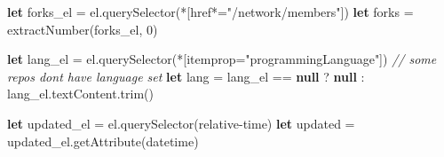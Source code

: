 \documentclass[sigplan,10pt,anonymous,review]{acmart}
\newenvironment{Shaded}{}{}
\newcommand{\AttributeTok}[1]{\textcolor[rgb]{0.49,0.56,0.16}{#1}}
\newcommand{\CommentTok}[1]{\textcolor[rgb]{0.38,0.63,0.69}{\textit{#1}}}
\newcommand{\DecValTok}[1]{\textcolor[rgb]{0.25,0.63,0.44}{#1}}
\newcommand{\KeywordTok}[1]{\textcolor[rgb]{0.00,0.44,0.13}{\textbf{#1}}}
\newcommand{\NormalTok}[1]{#1}
\newcommand{\OperatorTok}[1]{\textcolor[rgb]{0.40,0.40,0.40}{#1}}
\newcommand{\StringTok}[1]{\textcolor[rgb]{0.25,0.44,0.63}{#1}}
\newcommand{\VariableTok}[1]{\textcolor[rgb]{0.10,0.09,0.49}{#1}}
\begin{document}
\begin{Shaded}
\begin{Highlighting}[]
      \KeywordTok{let}\NormalTok{ forks\_el }\OperatorTok{=} \VariableTok{el}\NormalTok{.}\AttributeTok{querySelector}\NormalTok{(}\StringTok{\textquotesingle{}*[href*="/network/members"]\textquotesingle{}}\NormalTok{)}
      \KeywordTok{let}\NormalTok{ forks }\OperatorTok{=} \AttributeTok{extractNumber}\NormalTok{(forks\_el}\OperatorTok{,} \DecValTok{0}\NormalTok{)}

      \KeywordTok{let}\NormalTok{ lang\_el }\OperatorTok{=} \VariableTok{el}\NormalTok{.}\AttributeTok{querySelector}\NormalTok{(}\StringTok{\textquotesingle{}*[itemprop="programmingLanguage"]\textquotesingle{}}\NormalTok{)}
      \CommentTok{// some repos don\textquotesingle{}t have language set}
      \KeywordTok{let}\NormalTok{ lang }\OperatorTok{=}\NormalTok{ lang\_el }\OperatorTok{==} \KeywordTok{null} \OperatorTok{?} \KeywordTok{null}\NormalTok{ : }\VariableTok{lang\_el}\NormalTok{.}\VariableTok{textContent}\NormalTok{.}\AttributeTok{trim}\NormalTok{()}

      \KeywordTok{let}\NormalTok{ updated\_el }\OperatorTok{=} \VariableTok{el}\NormalTok{.}\AttributeTok{querySelector}\NormalTok{(}\StringTok{\textquotesingle{}relative{-}time\textquotesingle{}}\NormalTok{)}
      \KeywordTok{let}\NormalTok{ updated }\OperatorTok{=} \VariableTok{updated\_el}\NormalTok{.}\AttributeTok{getAttribute}\NormalTok{(}\StringTok{\textquotesingle{}datetime\textquotesingle{}}\NormalTok{)}


\end{Highlighting}
\end{Shaded}
\end{document}
